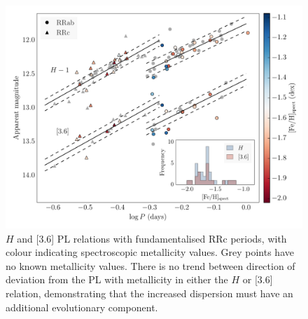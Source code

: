 \documentclass[a4paper,fleqn,usenatbib]{mnras}
\begin{document}
\begin{figure}
\begin{center}
\includegraphics[width=160mm]{reworked_fitting_code/final_plots/spect_color_PL.pdf}
\caption{$H$ and [3.6] PL relations with fundamentalised RRc periods, with colour indicating spectroscopic \citep{2006ApJ...640L..43S} metallicity values. Grey points have no known metallicity values. There is no trend between direction of deviation from the PL with metallicity in either the $H$ or [3.6] relation, demonstrating that the increased dispersion must have an additional evolutionary component.}
\label{fig:hband_spectro}
\end{center}
\end{figure}
\end{document}
